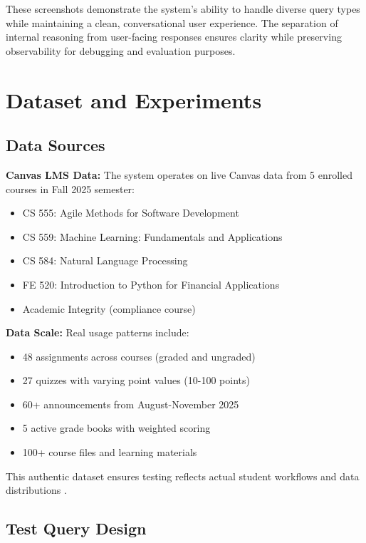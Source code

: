 \documentclass{article}
\begin{document}
These screenshots demonstrate the system's ability to handle diverse query types while maintaining a clean, conversational user experience. The separation of internal reasoning from user-facing responses ensures clarity while preserving observability for debugging and evaluation purposes.


\section{Dataset and Experiments}

\subsection{Data Sources}

\textbf{Canvas LMS Data:} The system operates on live Canvas data from 5 enrolled courses in Fall 2025 semester:

\begin{itemize}
    \item CS 555: Agile Methods for Software Development
    \item CS 559: Machine Learning: Fundamentals and Applications  
    \item CS 584: Natural Language Processing
    \item FE 520: Introduction to Python for Financial Applications
    \item Academic Integrity (compliance course)
\end{itemize}

\textbf{Data Scale:} Real usage patterns include:
\begin{itemize}
    \item 48 assignments across courses (graded and ungraded)
    \item 27 quizzes with varying point values (10-100 points)
    \item 60+ announcements from August-November 2025
    \item 5 active grade books with weighted scoring
    \item 100+ course files and learning materials
\end{itemize}

This authentic dataset ensures testing reflects actual student workflows and data distributions \cite{lms2025ai}.

\subsection{Test Query Design}
\end{document}

